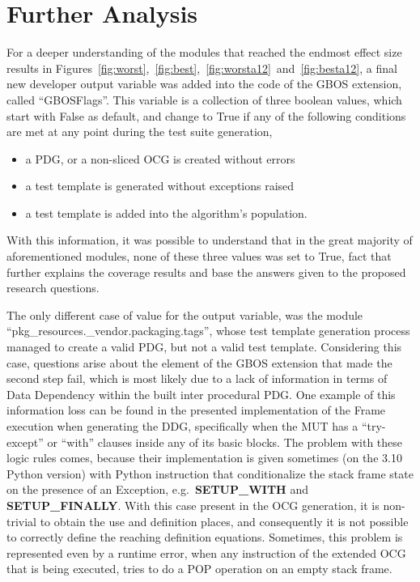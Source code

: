 \documentclass[%
  chapterprefix=false,%
  open=right,%
  twoside=true,%
  paper=a4,%
  logofile={Figures/logo.png},%
  thesistype=master,%
  UKenglish,%
]{se2thesis}
\begin{document}
\newpage

\section{Further Analysis}\label{sec:further}

For a deeper understanding of the modules that reached the endmost effect size results in Figures~\ref{fig:worst},~\ref{fig:best},~\ref{fig:worsta12}~and~\ref{fig:besta12}, a final new developer output variable was added into the code of the GBOS extension, called ``GBOSFlags''.
This variable is a collection of three boolean values, which start with False as default, and change to True if any of the following conditions are met at any point during the test suite generation,
\begin{itemize}
  \item a PDG, or a non-sliced OCG is created without errors
  \item a test template is generated without exceptions raised
  \item a test template is added into the algorithm's population.
\end{itemize}
With this information, it was possible to understand that in the great majority of aforementioned modules, none of these three values was set to True, fact that further explains the coverage results and base the answers given to the proposed research questions.

The only different case of value for the output variable, was the module ``pkg\_resources.\_vendor.packaging.tags'', whose test template generation process managed to create a valid PDG, but not a valid test template.
Considering this case, questions arise about the element of the GBOS extension that made the second step fail, which is most likely due to a lack of information in terms of Data Dependency within the built inter procedural PDG.\@
One example of this information loss can be found in the presented implementation of the Frame execution when generating the DDG, specifically when the MUT has a ``try-except'' or ``with'' clauses inside any of its basic blocks.
The problem with these logic rules comes, because their implementation is given sometimes (on the 3.10 Python version) with Python instruction that conditionalize the stack frame state on the presence of an Exception, e.g.~\textbf{SETUP\_WITH} and \textbf{SETUP\_FINALLY}.
With this case present in the OCG generation, it is non-trivial to obtain the use and definition places, and consequently it is not possible to correctly define the reaching definition equations.
Sometimes, this problem is represented even by a runtime error, when any instruction of the extended OCG that is being executed, tries to do a POP operation on an empty stack frame.  
\end{document}
